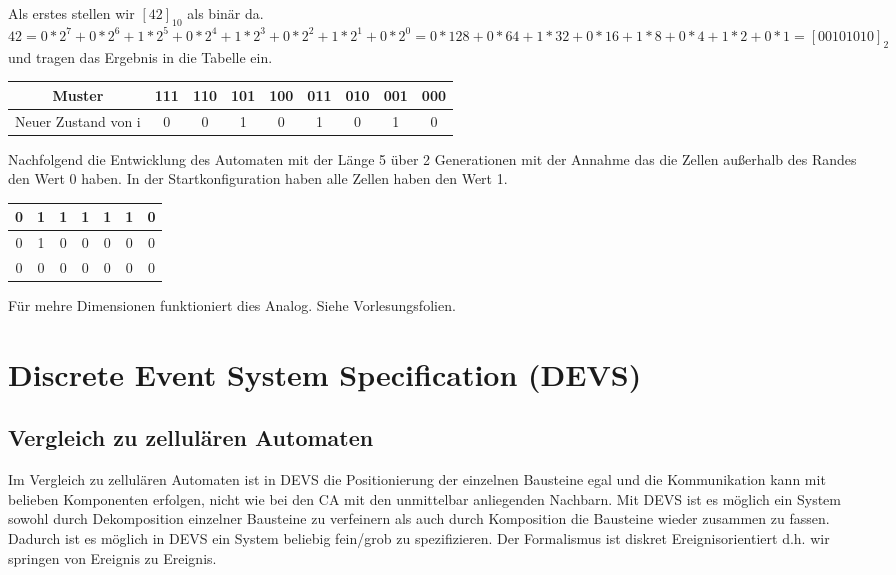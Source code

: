 \documentclass[11pt, fleqn, a4paper, leqno]{scrartcl} %
\begin{document}
		Als erstes stellen wir $[42]_{10}$ als binär da. $42= 0*2^{7}+0*2^{6}+1*2^{5}+0*2^{4}+1*2^{3}+0*2^{2}+1*2^{1}+0*2^{0}=0*128+0*64+1*32+0*16+1*8+0*4+1*2+0*1=[00101010]_{2}$ und tragen das Ergebnis in die Tabelle ein.
		\begin{center}
			\begin{tabular}{|c|c|c|c|c|c|c|c|c|}
			\hline Muster & 111 & 110 & 101 & 100 & 011 & 010 & 001 & 000 \\ 
			\hline Neuer Zustand von i & 0 & 0 & 1 & 0 & 1 & 0 & 1 & 0    \\ 
			\hline 
			\end{tabular} 
		\end{center}
		Nachfolgend die Entwicklung des Automaten mit der Länge 5 über 2 Generationen mit der Annahme das die Zellen außerhalb des Randes den Wert 0 haben. In der Startkonfiguration haben alle Zellen haben den Wert 1.
		\begin{center}
			\begin{tabular}{|c||c|c|c|c|c||c|}
			\hline 0 & 1 & 1 & 1 & 1 & 1 & 0 \\ 
			\hline 0 & 1 & 0 &  0& 0 & 0 & 0 \\ 
			\hline 0 & 0 & 0 & 0 & 0 & 0 & 0 \\ 
			\hline 
			\end{tabular} 
		\end{center}
		Für mehre Dimensionen funktioniert dies Analog. Siehe Vorlesungsfolien.
		\newpage
\section{Discrete Event System Specification (DEVS)}
	\subsection{Vergleich zu zellulären Automaten}
		Im Vergleich zu zellulären Automaten ist in DEVS die Positionierung der einzelnen Bausteine egal und die Kommunikation kann mit belieben Komponenten erfolgen, nicht wie bei den CA mit den unmittelbar anliegenden Nachbarn. Mit DEVS ist es möglich ein System sowohl durch Dekomposition einzelner Bausteine zu verfeinern als auch durch Komposition die Bausteine wieder zusammen zu fassen. Dadurch ist es möglich in DEVS ein System beliebig fein/grob zu spezifizieren. Der Formalismus ist diskret Ereignisorientiert d.h. wir springen von Ereignis zu Ereignis.
\end{document}
